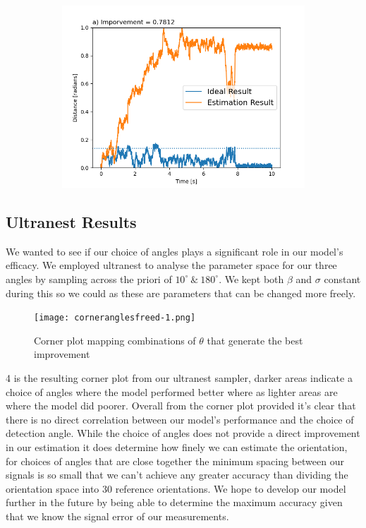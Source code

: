 \documentclass[preprint,3p]{elsarticle}
\begin{document}
\begin{figure}[b]
\begin{subfigure}{0.33\textwidth}
		\includegraphics[width=\textwidth]{./Images/154590_Beta=15.png}
	\end{subfigure}
\end{figure}
 

\newpage
\subsection{Ultranest Results}
\label{3.3}
We wanted to see if our choice of angles plays a significant role in our model's efficacy. We employed ultranest to analyse the parameter space for our three angles by sampling across the priori of $10^{\circ} \ \& \ 180^{\circ}$. We kept both $\beta$ and $\sigma$ constant during this so we could as these are parameters that can be changed more freely. 

\begin{figure}[h]
	\centering
	\texttt{[image: corneranglesfreed-1.png]}
	\caption{Corner plot mapping combinations of $\theta$ that generate the best improvement}
\end{figure}

\figurename{ 4} is the resulting corner plot from our ultranest sampler, darker areas indicate a choice of angles where the model performed better where as lighter areas are where the model did poorer. Overall from the corner plot provided it's clear that there is no direct correlation between our model's performance and the choice of detection angle. While the choice of angles does not provide a direct improvement in our estimation it does determine how finely we can estimate the orientation, for choices of angles that are close together the minimum spacing between our signals is so small that we can't achieve any greater accuracy than dividing the orientation space into 30 reference orientations. We hope to develop our model further in the future by being able to determine the maximum accuracy given that we know the signal error of our measurements.  
\end{document}
